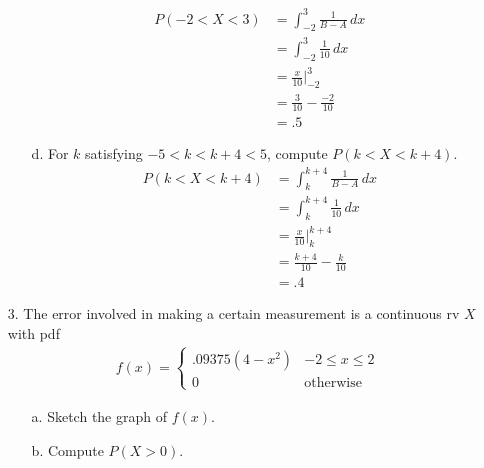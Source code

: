 \documentclass[letterpaper,12pt]{article}
\begin{document}
\begin{enumerate}
\begin{enumerate}
        \begin{align*}
          P(-2 < X < 3) &= \int_{-2}^{3} \frac{1}{B - A}\,dx \\
          &= \int_{-2}^{3} \frac{1}{10}\,dx \\
          &= \frac{x}{10}\bigg\rvert_{-2}^{3} \\
          &= \frac{3}{10} - \frac{-2}{10} \\
          &= .5
        \end{align*}
      \item[d.]
        For $k$ satisfying $-5 < k < k + 4 < 5$, compute $P(k < X < k + 4)$.
        \begin{align*}
          P(k < X < k + 4) &= \int_{k}^{k + 4} \frac{1}{B - A}\,dx \\
          &= \int_{k}^{k + 4} \frac{1}{10}\,dx \\
          &= \frac{x}{10}\bigg\rvert_{k}^{k + 4} \\
          &= \frac{k + 4}{10} - \frac{k}{10} \\
          &= .4
        \end{align*}
    \end{enumerate}
  \item[3.]
    The error involved in making a certain measurement is a continuous rv $X$ with pdf
    \begin{align*}
      f(x) = \begin{cases}
        .09375(4 - x^2) & -2 \le x \le 2 \\
        0               & \text{otherwise}
      \end{cases}
    \end{align*}
    \begin{enumerate}
      \item[a.]
        Sketch the graph of $f(x)$.
        \begin{center}
        \end{center}
      \item[b.]
        Compute $P(X > 0)$.
        \begin{align*}

\end{align*}
\end{enumerate}
\end{enumerate}
\end{document}
